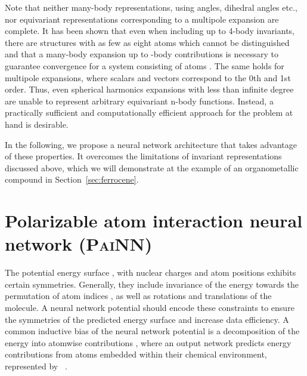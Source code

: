 \documentclass[reprint,
amsmath,amssymb,
 aip,jcp
]{revtex4-2}
\newcommand{\painn}{\textsc{PaiNN}}
\newcommand{\new}[1]{#1}
\begin{document}
\new{Note that neither many-body representations, using angles, dihedral angles etc., nor equivariant representations corresponding to a multipole expansion are complete.
It has been shown that even when including up to 4-body invariants, there are structures with as few as eight atoms which cannot be distinguished \cite{pozdnyakov2020incompleteness}{}  and that a many-body expansion up to -body contributions is necessary to guarantee convergence for a system consisting of  atoms \cite{hermann2007convergence}. The same holds for multipole expansions, where scalars and vectors correspond to the 0th and 1st order.
Thus, even spherical harmonics expansions with less than infinite degree are unable to represent arbitrary equivariant n-body functions.
Instead, a practically sufficient and computationally efficient approach for the problem at hand is desirable.}

In the following, we propose a neural network architecture that takes advantage of these properties. 
It overcomes the limitations of invariant representations discussed above, which we will demonstrate at the example of an organometallic compound in Section~\ref{sec:ferrocene}.

\section{Polarizable atom interaction neural network (\painn{})}

The potential energy surface , with nuclear charges  and atom positions  exhibits certain symmetries.
Generally, they include invariance of the energy towards the permutation of atom indices , as well as rotations and translations of the molecule.
A neural network potential should encode these constraints to ensure the symmetries of the predicted energy surface and increase data efficiency.
A common inductive bias of the neural network potential is a decomposition of the energy into atomwise contributions 
,
where an output network  predicts energy contributions from atoms embedded within their chemical environment, represented by ~\cite{behler2007generalized,bartok2013representing}.
\end{document}
